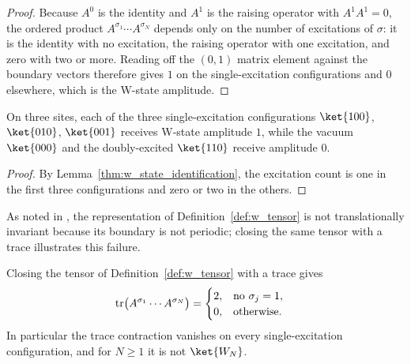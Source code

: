 \begin{proof}
    \leanok
    Because $A^0$ is the identity and $A^1$ is the raising operator with
    $A^1A^1=0$, the ordered product
    $A^{\sigma_1}\cdots A^{\sigma_N}$ depends only on the number of excitations
    of $\sigma$: it is the identity with no excitation, the raising operator
    with one excitation, and zero with two or more. Reading off the $(0,1)$
    matrix element against the boundary vectors therefore gives $1$ on the
    single-excitation configurations and $0$ elsewhere, which is the W-state
    amplitude.
\end{proof}

\begin{lemma}%
    \label{thm:w_state_three_excited}
    \leanok
    On three sites, each of the three single-excitation configurations
    $\ket{100}$, $\ket{010}$, $\ket{001}$ receives W-state amplitude $1$, while
    the vacuum $\ket{000}$ and the doubly-excited $\ket{110}$ receive
    amplitude $0$.
\end{lemma}

\begin{proof}
    \leanok
    By Lemma~\ref{thm:w_state_identification}, the excitation count is one in
    the first three configurations and zero or two in the others.
\end{proof}

As noted in \cite[Appendix~A, ``The W state'']{Cirac2021Matrix}, the
representation of Definition~\ref{def:w_tensor} is not translationally
invariant because its boundary is not periodic; closing the same tensor with a
trace illustrates this failure.

\begin{lemma}%
    \label{thm:w_state_periodic_closure}
    \leanok
    Closing the tensor of Definition~\ref{def:w_tensor} with a trace gives
    \begin{align}
        \operatorname{tr}\bigl(A^{\sigma_1}\cdots A^{\sigma_N}\bigr)
         & =
        \begin{cases}
            2, & \text{no } \sigma_j=1, \\
            0, & \text{otherwise}.
        \end{cases}
        \notag
    \end{align}
    In particular the trace contraction vanishes on every single-excitation
    configuration, and for $N\geq 1$ it is not $\ket{W_N}$.
\end{lemma}

